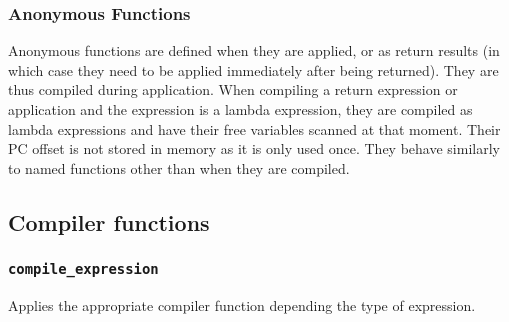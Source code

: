 \subsubsection{Anonymous Functions}
Anonymous functions are defined when they are applied, or as return results (in which case they need to be applied immediately after being returned). They are thus compiled during application. When compiling a return expression or application and the expression is a lambda expression, they are compiled as lambda expressions and have their free variables scanned at that moment. Their PC offset is not stored in memory as it is only used once. They behave similarly to named functions other than when they are compiled. 



\newpage
\subsection{Compiler functions}
\subsubsection{\texttt{compile\_expression}}
Applies the appropriate compiler function depending the type of expression. \\\\
\begin{prooftree}
\end{prooftree}
